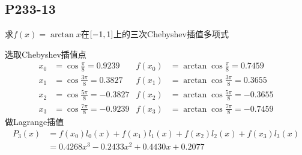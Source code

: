 \subsection{P233-13}
\renewcommand{\FX}{\arctan x}
\renewcommand{\LRANGE}{-1}
\renewcommand{\RRANGE}{1}
求$f(x) = \FX$在$\RANGE$上的三次Chebyshev插值多项式
\begin{SOLVE}
选取Chebyshev插值点
\begin{align*}
x_0 & = \cos\frac{ \pi}{8} =  0.9239 & f(x_0) & = \arctan\cos\frac{ \pi}{8} =  0.7459 \\
x_1 & = \cos\frac{3\pi}{8} =  0.3827 & f(x_1) & = \arctan\cos\frac{3\pi}{8} =  0.3655 \\
x_2 & = \cos\frac{5\pi}{8} = -0.3827 & f(x_2) & = \arctan\cos\frac{5\pi}{8} = -0.3655 \\
x_3 & = \cos\frac{7\pi}{8} = -0.9239 & f(x_3) & = \arctan\cos\frac{7\pi}{8} = -0.7459
\end{align*}
做Lagrange插值
\begin{align*}
P_3(x) & = f(x_0) l_0(x) + f(x_1) l_1(x) + f(x_2) l_2(x) + f(x_3) l_3(x)\\
       & = 0.4268 x^3 - 0.2433 x^2 + 0.4430 x + 0.2077
\end{align*}
\end{SOLVE}